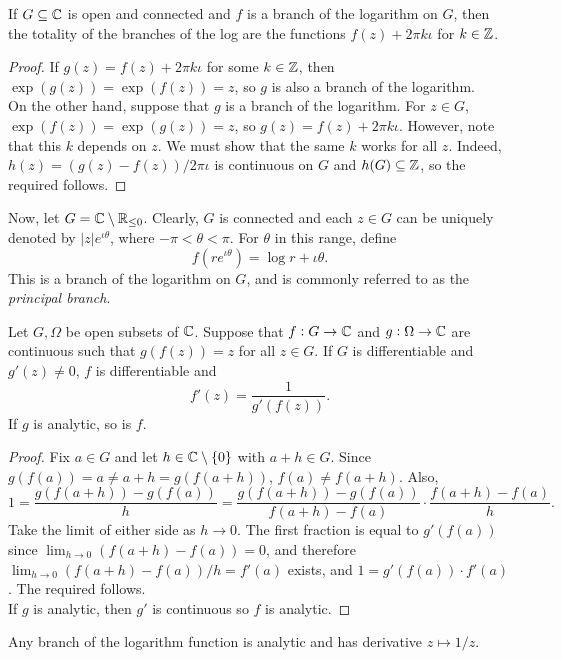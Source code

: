 	\begin{lemma}
		If $G \subseteq \mathbb{C}$ is open and connected and $f$ is a branch of the logarithm on $G$, then the totality of the branches of the log are the functions $f(z) + 2\pi k\iota$ for $k \in \mathbb{Z}$.
	\end{lemma}
	\begin{proof}
		If $g(z) = f(z) + 2\pi k\iota$ for some $k \in \mathbb{Z}$, then $\exp(g(z)) = \exp(f(z)) = z$, so $g$ is also a branch of the logarithm.\\
		On the other hand, suppose that $g$ is a branch of the logarithm. For $z\in G$, $\exp(f(z)) = \exp(g(z)) = z$, so $g(z) = f(z) + 2\pi k\iota$. However, note that this $k$ depends on $z$. We must show that the same $k$ works for all $z$. Indeed, $h(z) = (g(z) - f(z))/2\pi\iota$ is continuous on $G$ and $h(G) \subseteq \mathbb{Z}$, so the required follows.
	\end{proof}


	Now, let $G = \mathbb{C} \setminus \mathbb{R}_{\le 0}$. Clearly, $G$ is connected and each $z \in G$ can be uniquely denoted by $|z| e^{\iota\theta}$, where $-\pi < \theta < \pi$. For $\theta$ in this range, define
	\[ f(r e^{\iota\theta}) = \log r + \iota\theta. \]
	This is a branch of the logarithm on $G$, and is commonly referred to as the \emph{principal branch}.

	\begin{theorem}
		Let $G,\Omega$ be open subsets of $\mathbb{C}$. Suppose that $f : G \to \mathbb{C}$ and $g : \Omega \to \mathbb{C}$ are continuous such that $g(f(z)) = z$ for all $z \in G$. If $G$ is differentiable and $g'(z) \ne 0$, $f$ is differentiable and
		\[ f'(z) = \frac{1}{g'(f(z))}. \]
		If $g$ is analytic, so is $f$.
	\end{theorem}
	\begin{proof}
		Fix $a \in G$ and let $h \in \mathbb{C} \setminus \{0\}$ with $a+h \in G$. Since $g(f(a)) = a \ne a+h = g(f(a+h))$, $f(a) \ne f(a+h)$.
		Also,
		\[ 1 = \frac{g(f(a+h)) - g(f(a))}{h} = \frac{g(f(a+h)) - g(f(a))}{f(a+h)-f(a)} \cdot \frac{f(a+h)-f(a)}{h}. \]
		Take the limit of either side as $h \to 0$. The first fraction is equal to $g'(f(a))$ since $\lim_{h\to 0} (f(a+h) - f(a)) = 0$, and therefore $\lim_{h\to0} (f(a+h) - f(a))/h = f'(a)$ exists, and $1 = g'(f(a)) \cdot f'(a)$. The required follows.\\
		If $g$ is analytic, then $g'$ is continuous so $f$ is analytic.
	\end{proof}

	\begin{corollary}
		Any branch of the logarithm function is analytic and has derivative $z \mapsto 1/z$.
	\end{corollary}

